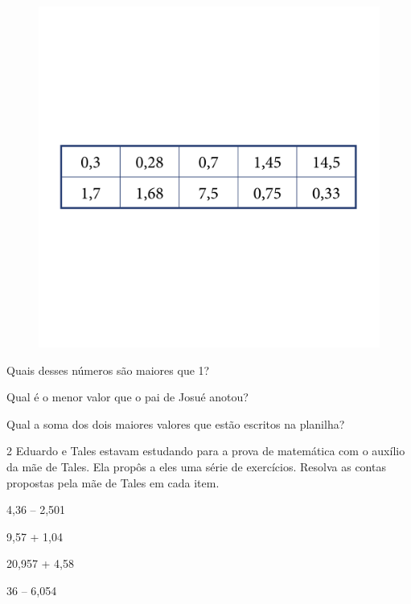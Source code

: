 \begin{figure}[htpb!]
\includegraphics[width=\textwidth]{../ilustracoes/MAT5/SAEB_5ANO_MAT_figura86.png}
\end{figure}

\begin{escolha}
\item
  Quais desses números são maiores que 1?


\item
  Qual é o menor valor que o pai de Josué anotou?


\item
  Qual a soma dos dois maiores valores que estão escritos na planilha?

\end{escolha}


\num{2} Eduardo e Tales estavam estudando para a prova de matemática com o
auxílio da mãe de Tales. Ela propôs a eles uma série de exercícios.
Resolva as contas propostas pela mãe de Tales em cada item.

\begin{escolha}
\item
  4,36 -- 2,501


\item
  9,57 + 1,04


\item
  20,957 + 4,58


\item
  36 -- 6,054

\end{escolha}

